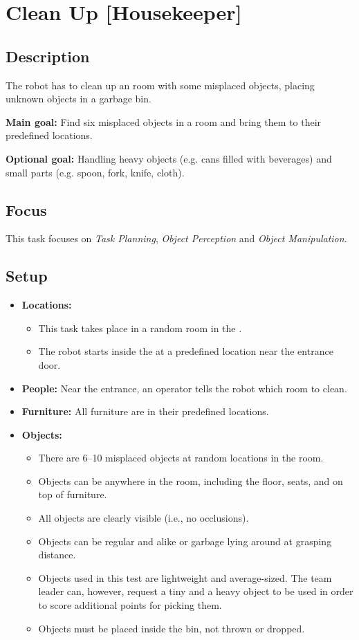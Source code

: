 \section{Clean Up [Housekeeper]}
\label{test:clean-up}

\subsection*{Description}
	The robot has to clean up an \Arena{} room with some misplaced objects, placing unknown objects in a garbage bin.

\textbf{Main goal:}
	Find six misplaced objects in a room and bring them to their predefined locations.

\textbf{Optional goal:}
	Handling heavy objects (e.g. cans filled with beverages) and small parts (e.g. spoon, fork, knife, cloth).

\subsection*{Focus}
	This task focuses on 
	\textit{Task Planning},
	\textit{Object Perception} and
	\textit{Object Manipulation}.

\subsection*{Setup}
\begin{itemize}[nosep]	
	\item \textbf{Locations:} 
		\begin{itemize}
			\item This task takes place in a random room in the \Arena{}.
			\item The robot starts inside the \Arena{} at a predefined location near the entrance door.
		\end{itemize}
	\item \textbf{People:} Near the entrance, an operator tells the robot which room to clean.
	\item \textbf{Furniture:} All furniture are in their predefined locations.
	\item \textbf{Objects:} 
		\begin{itemize}
			\item There are 6--10 misplaced objects at random locations in the room.
			\item Objects can be anywhere in the room, including the floor, seats, and on top of furniture.
			\item All objects are clearly visible (i.e., no occlusions).
			\item Objects can be regular and alike or garbage lying around at grasping distance.
			\item Objects used in this test are lightweight and average-sized. The team leader can, however, request a tiny and a heavy object to be used in order to score additional points for picking them.
			\item Objects must be placed inside the bin, not thrown or dropped.
		\end{itemize}
\end{itemize}

